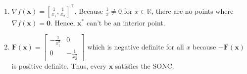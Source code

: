 \documentclass[10pt]{article}
\begin{document}
\begin{enumerate}
\begin{enumerate}
        \item $\nabla f(\mathbf{x})={[\frac{1}{x_1},\frac{1}{x_2}]}^\top$. Because $\frac{1}{x}\neq0$ for $x\in\mathbb{R}$, there are no points where $\nabla f(\mathbf{x})=\mathbf{0}$. Hence, $\mathbf{x^*}$ can't be an interior point.
        \item $\mathbf{F(x)}=\begin{bmatrix}
            -\frac{1}{x_1^2} & 0\\
            0 & -\frac{1}{x_2^2}
        \end{bmatrix}$ which is negative definite for all $x$ because $-\mathbf{F(x)}$ is positive definite. Thus, every $\mathbf{x}$ satisfies the SONC.
    \end{enumerate}
\end{enumerate}
\end{document}
